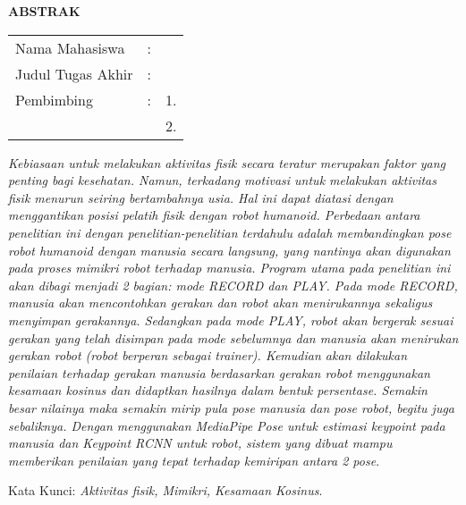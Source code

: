 \begin{center}
  \large\textbf{ABSTRAK}
\end{center}


\vspace{2ex}

\begingroup
\setlength{\tabcolsep}{0pt}

\noindent
\begin{tabularx}{\textwidth}{l >{\centering}m{2em} X}
  Nama Mahasiswa    & : & \name{}         \\

  Judul Tugas Akhir & : & \tatitle{}      \\

  Pembimbing        & : & 1. \advisor{}   \\
                    &   & 2. \coadvisor{} \\
\end{tabularx}
\endgroup

\emph{Kebiasaan untuk melakukan aktivitas fisik secara teratur merupakan faktor yang penting bagi kesehatan. 
Namun, terkadang motivasi untuk melakukan aktivitas fisik menurun seiring bertambahnya usia.
Hal ini dapat diatasi dengan menggantikan posisi pelatih fisik dengan robot humanoid. 
Perbedaan antara penelitian ini dengan penelitian-penelitian terdahulu adalah membandingkan pose robot humanoid dengan manusia secara langsung, 
yang nantinya akan digunakan pada proses mimikri robot terhadap manusia. 
Program utama pada penelitian ini akan dibagi menjadi 2 bagian: mode RECORD dan PLAY. Pada mode RECORD, manusia akan mencontohkan gerakan dan robot akan menirukannya
sekaligus menyimpan gerakannya. Sedangkan pada mode PLAY, robot akan bergerak sesuai gerakan yang telah disimpan pada mode sebelumnya dan manusia akan menirukan gerakan robot (robot berperan sebagai trainer).
Kemudian akan dilakukan penilaian terhadap gerakan manusia berdasarkan gerakan robot menggunakan kesamaan kosinus dan didaptkan hasilnya dalam bentuk persentase.
Semakin besar nilainya maka semakin mirip pula pose manusia dan pose robot, begitu juga sebaliknya.
Dengan menggunakan MediaPipe Pose untuk estimasi keypoint pada manusia dan Keypoint RCNN untuk robot, sistem yang dibuat mampu memberikan penilaian yang tepat terhadap kemiripan antara 2 pose}.

Kata Kunci: \emph{Aktivitas fisik, Mimikri, Kesamaan Kosinus}.
